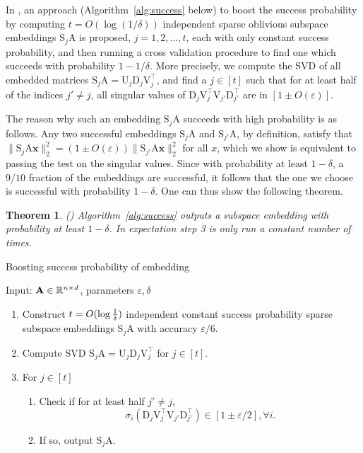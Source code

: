 \documentclass[11pt]{article}
\newcommand{\R}{\ensuremath\mathbb{R}}
\newtheorem{theorem}{Theorem}
\newcommand{\mat}[1]{{\ensuremath{\bm{\mathrm{#1}}}}}
\def\matA{\mat{A}}
\def\matD{\mat{D}}
\def\matS{\mat{S}}
\def\matU{\mat{U}}
\def\matV{\mat{V}}
\def\frac#1#2{{#1\over #2}}
\def\x{{\mathbf x}}
\begin{document}
In \cite{BKLW14}, an approach (Algorithm~\ref{alg:success} below) to boost the success probability 
by computing $t = O(\log (1/\delta))$
independent sparse oblivious subspace embeddings $\matS_j\matA$ is proposed, $j = 1, 2, \ldots, t$, 
each with only constant success probability,
and then running a cross validation procedure to find one which succeeds with probability $1-1/\delta$.
More precisely, we compute the SVD of all embedded matrices $\matS_j\matA = \matU_j \matD_j \matV_j^\top$,
and find a $j \in [t]$ such that for at least half of the indices $j' \neq j$,
all singular values of $\matD_j \matV_j^\top \matV_{j'} \matD_{j'}^\top$ are in $[1 \pm O(\varepsilon)]$.

The reason why such an embedding $\matS_j \matA$ succeeds with high probability is as follows.
Any two successful embeddings $\matS_j \matA$ and $\matS_{j'} \matA$, by definition, satisfy that
$\| \matS_j \matA \x \|^2_2  = (1 \pm O(\varepsilon)) \| \matS_{j'} \matA \x \|_2^2$ for all $x$,
which we show is equivalent to passing the test on the singular values.
Since with probability at least $1-\delta$, a $9/10$ fraction of the embeddings are successful,
it follows that the one we choose is successful with probability $1-\delta$. One can thus show
the following theorem.

\begin{theorem}\label{thm:success}(\cite{BKLW14})
Algorithm~\ref{alg:success} outputs a subspace embedding with probability at least $1-\delta$.
In expectation step 3 is only run a constant number of times.
\end{theorem}

\begin{algorithm}[t]
\caption{Boosting success probability of embedding}
\label{alg:success}
Input: $\matA \in \R^{n\times d}$, parameters $\varepsilon, \delta$
\begin{enumerate}
\item Construct $t=O(\log \frac{1}{\delta})$ independent constant success probability sparse subspace embeddings $\matS_j \matA$
with accuracy $\varepsilon/6$.
\item Compute SVD $\matS_j\matA = \matU_j \matD_j \matV_j^\top$ for $j\in [t]$.
\item For $j \in [t]$
\begin{enumerate}
\item Check if for at least half $j' \neq j$, $$\sigma_i(\matD_j \matV_j^\top \matV_{j'} \matD_{j'}^\top) \in [1\pm \varepsilon/2],\forall i.$$
\item If so, output $\matS_j \matA$.
\end{enumerate}
\end{enumerate}
\end{algorithm}
\end{document}
